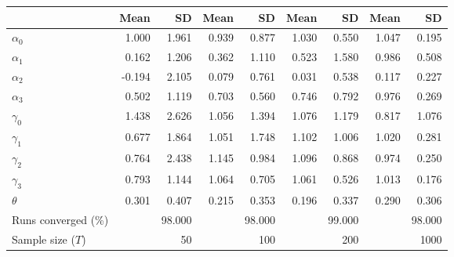 
\begin{tabular}[t]{lrrrrrrrr}
\toprule
  & Mean & SD & Mean  & SD  & Mean   & SD   & Mean    & SD   \\
\midrule
$\alpha_{0}$ & 1.000 & 1.961 & 0.939 & 0.877 & 1.030 & 0.550 & 1.047 & 0.195\\
$\alpha_{1}$ & 0.162 & 1.206 & 0.362 & 1.110 & 0.523 & 1.580 & 0.986 & 0.508\\
$\alpha_{2}$ & -0.194 & 2.105 & 0.079 & 0.761 & 0.031 & 0.538 & 0.117 & 0.227\\
$\alpha_{3}$ & 0.502 & 1.119 & 0.703 & 0.560 & 0.746 & 0.792 & 0.976 & 0.269\\
$\gamma_{0}$ & 1.438 & 2.626 & 1.056 & 1.394 & 1.076 & 1.179 & 0.817 & 1.076\\
$\gamma_{1}$ & 0.677 & 1.864 & 1.051 & 1.748 & 1.102 & 1.006 & 1.020 & 0.281\\
$\gamma_{2}$ & 0.764 & 2.438 & 1.145 & 0.984 & 1.096 & 0.868 & 0.974 & 0.250\\
$\gamma_{3}$ & 0.793 & 1.144 & 1.064 & 0.705 & 1.061 & 0.526 & 1.013 & 0.176\\
$\theta$ & 0.301 & 0.407 & 0.215 & 0.353 & 0.196 & 0.337 & 0.290 & 0.306\\
Runs converged (\%) &  & 98.000 &  & 98.000 &  & 99.000 &  & 98.000\\
Sample size ($T$) &  & 50 &  & 100 &  & 200 &  & 1000\\
\bottomrule
\end{tabular}
